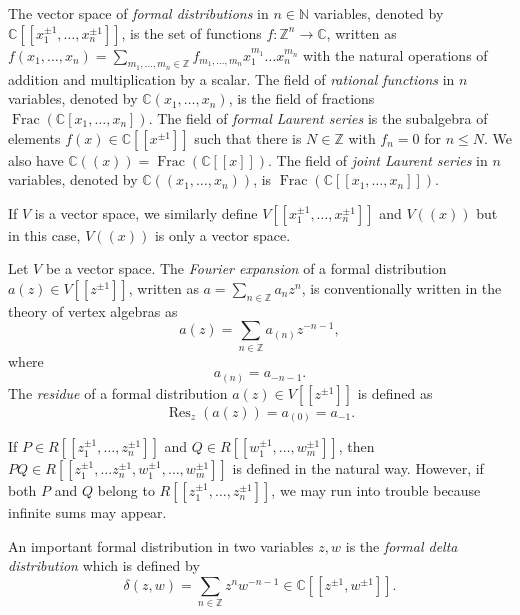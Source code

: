 \documentclass[a4paper, 12pt, reqno]{amsart}
\theoremstyle{remark}
\numberwithin{equation}{subsection}
\DeclareMathOperator{\Frac}{Frac}
\DeclareMathOperator{\Res}{Res}
\begin{document}
The vector space of \emph{formal distributions} in $n \in \mathbb{N}$ variables, denoted by $\mathbb{C}[[x_1^{\pm 1}, \dots, x_n^{\pm 1}]]$, is the set of functions $f: \mathbb{Z}^n \to \mathbb{C}$, written as $f(x_1, \dots, x_n) = \sum_{m_1, \dots, m_n \in \mathbb{Z}}f_{m_1, \dots, m_n}x_1^{m_1}\dots x_n^{m_n} $ with the natural operations of addition and multiplication by a scalar.
The field of \emph{rational functions} in $n$ variables, denoted by $\mathbb{C}(x_1, \dots, x_n)$, is the field of fractions $\Frac(\mathbb{C}[x_1, \dots, x_n])$.
The field of \emph{formal Laurent series} is the subalgebra of elements $f(x) \in \mathbb{C}[[x^{\pm 1}]]$ such that there is $N \in \mathbb{Z}$ with $f_n = 0$ for $n \le N$.
We also have $\mathbb{C}((x)) = \Frac(\mathbb{C}[[x]])$.
The field of \emph{joint Laurent series} in $n$ variables, denoted by $\mathbb{C}((x_1, \dots, x_n))$, is $\Frac(\mathbb{C}[[x_1, \dots, x_n]])$.

If $V$ is a vector space, we similarly define $V[[x_1^{\pm 1}, \dots, x_n^{\pm 1}]]$ and $V((x))$ but in this case, $V((x))$ is only a vector space.

Let $V$ be a vector space.
The \emph{Fourier expansion} of a formal distribution $a(z) \in V[[z^{\pm 1}]]$, written as $a = \sum_{n \in \mathbb{Z}} a_nz^n$, is conventionally written in the theory of vertex algebras as
\begin{equation*}
  a(z) = \sum_{n \in \mathbb{Z}}a_{(n)}z^{-n - 1},
\end{equation*}
where
\begin{equation*}
  a_{(n)} = a_{-n-1}.
\end{equation*}
The \emph{residue} of a formal distribution $a(z) \in V[[z^{\pm 1}]]$ is defined as
\begin{equation*}
  \Res_z(a(z)) = a_{(0)} = a_{-1}.
\end{equation*}

If $P \in R[[z_1^{\pm 1}, \dots, z_n^{\pm 1}]]$ and $Q \in R[[w_1^{\pm 1}, \dots, w_m^{\pm 1}]]$, then $PQ \in R[[z_1^{\pm 1}, \dots z_n^{\pm 1}, w_1^{\pm 1}, \dots, w_m^{\pm 1}]]$ is defined in the natural way.
However, if both $P$ and $Q$ belong to $R[[z_1^{\pm 1}, \dots, z_n^{\pm 1}]]$, we may run into trouble because infinite sums may appear.

An important formal distribution in two variables $z, w$ is the \emph{formal delta distribution} which is defined by
\begin{equation*}
  \delta(z, w) = \sum_{n \in \mathbb{Z}}z^nw^{-n - 1} \in \mathbb{C}[[z^{\pm 1}, w^{\pm 1}]].
\end{equation*}
\end{document}

